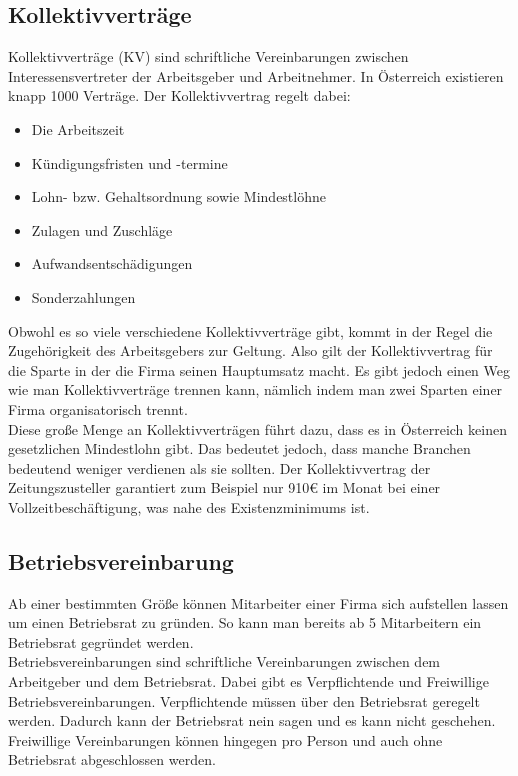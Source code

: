 \documentclass{article}
\begin{document}
	\subsection{Kollektivverträge}
	Kollektivverträge (KV) sind schriftliche Vereinbarungen zwischen Interessensvertreter der Arbeitsgeber und Arbeitnehmer. In Österreich existieren knapp 1000 Verträge. Der Kollektivvertrag regelt dabei:
	\begin{itemize}
		\item{Die Arbeitszeit}
		\item{Kündigungsfristen und -termine}
		\item{Lohn- bzw. Gehaltsordnung sowie Mindestlöhne}
		\item{Zulagen und Zuschläge}
		\item{Aufwandsentschädigungen}
		\item{Sonderzahlungen}
	\end{itemize}
	Obwohl es so viele verschiedene Kollektivverträge gibt, kommt in der Regel die Zugehörigkeit des Arbeitsgebers zur Geltung. Also gilt der Kollektivvertrag für die Sparte in der die Firma seinen Hauptumsatz macht. Es gibt jedoch einen Weg wie man Kollektivverträge trennen kann, nämlich indem man zwei Sparten einer Firma organisatorisch trennt. \\
	Diese große Menge an Kollektivverträgen führt dazu, dass es in Österreich keinen gesetzlichen Mindestlohn gibt. Das bedeutet jedoch, dass manche Branchen bedeutend weniger verdienen als sie sollten. Der Kollektivvertrag der Zeitungszusteller garantiert zum Beispiel nur 910€ im Monat bei einer Vollzeitbeschäftigung, was nahe des Existenzminimums ist.
	\subsection{Betriebsvereinbarung}
	Ab einer bestimmten Größe können Mitarbeiter einer Firma sich aufstellen lassen um einen Betriebsrat zu gründen. So kann man bereits ab 5 Mitarbeitern ein Betriebsrat gegründet werden. \\
	Betriebsvereinbarungen sind schriftliche Vereinbarungen zwischen dem Arbeitgeber und dem Betriebsrat. Dabei gibt es Verpflichtende und Freiwillige Betriebsvereinbarungen. Verpflichtende müssen über den Betriebsrat geregelt werden. Dadurch kann der Betriebsrat nein sagen und es kann nicht geschehen. Freiwillige Vereinbarungen können hingegen pro Person und auch ohne Betriebsrat abgeschlossen werden.
\end{document}
